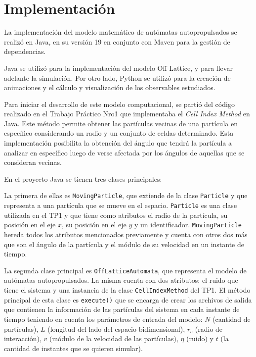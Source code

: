 \documentclass[11pt, a4paper]{article}
\begin{document}
    \newpage

    \section{Implementación}
    \label{sec:implementacion}

        La implementación del modelo matemático de autómatas autopropulsados se realizó en Java, en su versión 19 en
        conjunto con Maven para la gestión de dependencias.

        Java se utilizó para la implementación del modelo Off Lattice, y para llevar adelante la simulación.
        Por otro lado, Python se utilizó para la creación de animaciones y el cálculo y visualización de los observables
        estudiados.

        Para iniciar el desarrollo de este modelo computacional, se partió del código realizado en el Trabajo Práctico Nro\. 1 que
        implementaba el \textit{Cell Index Method} en Java.
        Este método permite obtener las partículas vecinas de una partícula en específico considerando un radio y un conjunto de celdas determinado.
        Esta implementación posibilita la obtención del ángulo que tendrá la partícula a analizar en específico luego de verse afectada por los ángulos de aquellas que se consideran vecinas.

        En el proyecto Java se tienen tres clases principales:

        La primera de ellas es \texttt{MovingParticle}, que extiende de la clase \texttt{Particle} y que representa a una
        partícula que se mueve en el espacio.
        \texttt{Particle} es una clase utilizada en el TP1 y que tiene como atributos el radio de la partícula, su posición en el eje $x$, su posición en el eje $y$ y un
        identificador. \texttt{MovingParticle} hereda todos los atributos mencionados previamente y cuenta con otros dos más que son
        el ángulo de la partícula y el módulo de su velocidad en un instante de tiempo.

        La segunda clase principal es \texttt{OffLatticeAutomata}, que representa el modelo de autómatas autopropulsados.
        La misma cuenta con dos atributos: el ruido que tiene el sistema y una instancia de la clase \texttt{CellIndexMethod} del TP1.
        El método principal de esta clase es \texttt{execute()} que se encarga de crear los archivos de salida que contienen la información de las partículas del sistema
        en cada instante de tiempo teniendo en cuenta los parámetros de entrada del modelo: $N$ (cantidad de partículas), $L$ (longitud
        del lado del espacio bidimensional), $r_c$ (radio de interacción), $v$ (módulo de la velocidad de las partículas), $\eta$ (ruido) y
        $t$ (la cantidad de instantes que se quieren simular).
\end{document}
